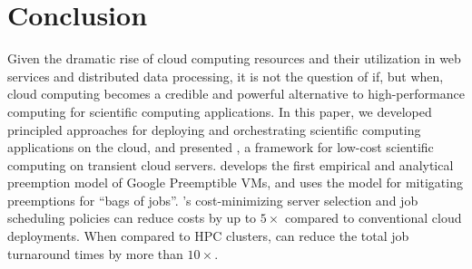 
\section{Conclusion}
\label{sec:conclusion}
Given the dramatic rise of  cloud computing resources and their utilization in web services and distributed data processing, it is not the question of if, but when,  cloud computing becomes a credible and powerful alternative to high-performance computing for scientific computing applications. 
In this paper, we developed principled approaches for deploying and orchestrating scientific computing applications on the cloud, and presented \sysname, a framework for low-cost scientific computing on  transient cloud servers. 
\sysname develops the first empirical and analytical preemption model of Google Preemptible VMs, and uses the model for mitigating preemptions for ``bags of jobs''. 
\sysname's cost-minimizing server selection and job scheduling policies can reduce costs by up to $5\times$ compared to conventional cloud deployments.
When compared to HPC clusters, \sysname can reduce the total job turnaround times by more than $10\times$. 


